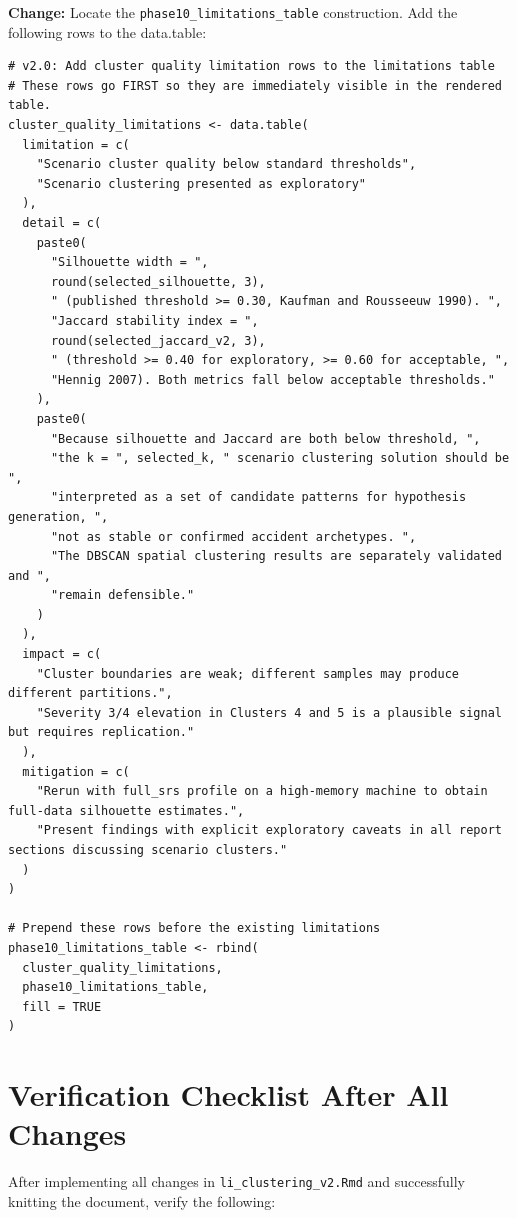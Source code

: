 \documentclass[11pt]{article}
\newcommand{\rfile}[1]{\texttt{#1}}
\newcommand{\rcode}[1]{\texttt{#1}}
\begin{document}
\textbf{Change:} Locate the \rcode{phase10\_limitations\_table} construction.
Add the following rows to the data.table:

\begin{lstlisting}
# v2.0: Add cluster quality limitation rows to the limitations table
# These rows go FIRST so they are immediately visible in the rendered table.
cluster_quality_limitations <- data.table(
  limitation = c(
    "Scenario cluster quality below standard thresholds",
    "Scenario clustering presented as exploratory"
  ),
  detail = c(
    paste0(
      "Silhouette width = ",
      round(selected_silhouette, 3),
      " (published threshold >= 0.30, Kaufman and Rousseeuw 1990). ",
      "Jaccard stability index = ",
      round(selected_jaccard_v2, 3),
      " (threshold >= 0.40 for exploratory, >= 0.60 for acceptable, ",
      "Hennig 2007). Both metrics fall below acceptable thresholds."
    ),
    paste0(
      "Because silhouette and Jaccard are both below threshold, ",
      "the k = ", selected_k, " scenario clustering solution should be ",
      "interpreted as a set of candidate patterns for hypothesis generation, ",
      "not as stable or confirmed accident archetypes. ",
      "The DBSCAN spatial clustering results are separately validated and ",
      "remain defensible."
    )
  ),
  impact = c(
    "Cluster boundaries are weak; different samples may produce different partitions.",
    "Severity 3/4 elevation in Clusters 4 and 5 is a plausible signal but requires replication."
  ),
  mitigation = c(
    "Rerun with full_srs profile on a high-memory machine to obtain full-data silhouette estimates.",
    "Present findings with explicit exploratory caveats in all report sections discussing scenario clusters."
  )
)

# Prepend these rows before the existing limitations
phase10_limitations_table <- rbind(
  cluster_quality_limitations,
  phase10_limitations_table,
  fill = TRUE
)
\end{lstlisting}

\section{Verification Checklist After All Changes}

After implementing all changes in \rfile{li\_clustering\_v2.Rmd} and
successfully knitting the document, verify the following:
\end{document}
